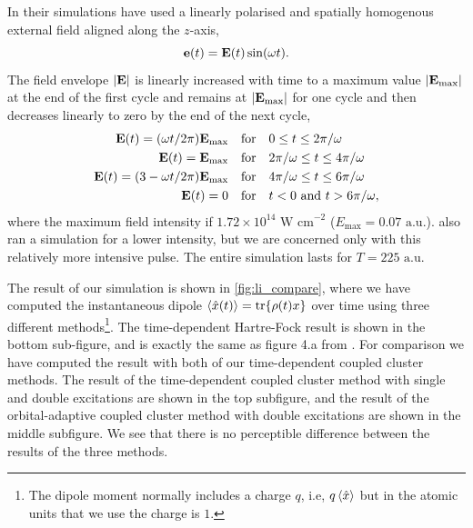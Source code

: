 In their simulations \citeauthor{li2005time} have used a linearly polarised and 
spatially homogenous external field aligned along the $z$-axis, 
\begin{equation}
    \vb{e}(t) = \vb{E}(t)\sin(\omega t).
\end{equation}
The field envelope $|\vb{E}|$ is linearly increased with time to a maximum value 
$|\vb{E}_\text{max}|$ at the end of the first cycle and remains at $|\vb{E}_\text{max}|$
for one cycle and then decreases linearly to zero by the end of the next cycle,
\begin{equation}
    \label{eq:li_laser}
    \begin{aligned}
        \vb{E}(t) = (\omega t / 2\pi) \vb{E}_\text{max} \quad &\text{for} \quad
            0 \leq t \leq 2\pi / \omega \\ 
        \vb{E}(t) = \vb{E}_\text{max} \quad &\text{for} \quad 
            2\pi / \omega \leq t \leq 4\pi / \omega \\ 
        \vb{E}(t) = (3 - \omega t / 2\pi) \vb{E}_\text{max} \quad &\text{for} \quad 
            4\pi / \omega \leq t \leq 6\pi / \omega \\
        \vb{E}(t) = 0 \quad &\text{for} \quad
            t < 0 \text{ and } t > 6\pi / \omega,
    \end{aligned}
\end{equation}
where the maximum field intensity if $1.72\times10^{14} \text{ W cm}^{-2}$ 
($E_\text{max} = 0.07 \text{ a.u.}$). \citeauthor{li2005time} also ran a simulation 
for a lower intensity, but we are concerned only with this relatively more intensive 
pulse. The entire simulation lasts for $T=225 \text{ a.u.}$

The result of our simulation is shown in \autoref{fig:li_compare}, where we have 
computed the instantaneous dipole $\ev{\hat{x}(t)} = \tr{\rho(t)x}$ over time using
three different methods\footnote{The dipole moment normally includes a charge $q$, i.e,
$q\ev{\hat{x}}$ but in 
the atomic units that we use the charge is $1$.}. The 
time-dependent Hartre-Fock result is shown in the bottom sub-figure, and
is exactly the same as figure 4.a from \citeauthor{li2005time} \cite{li2005time}.
For comparison we have computed the result with both of 
our time-dependent coupled cluster methods. The result of the time-dependent 
coupled cluster method with single and double excitations are shown in the top subfigure,
and the result of the orbital-adaptive coupled cluster method with double excitations 
are shown in the middle subfigure. We see that there is no perceptible difference between 
the results of the three methods.



